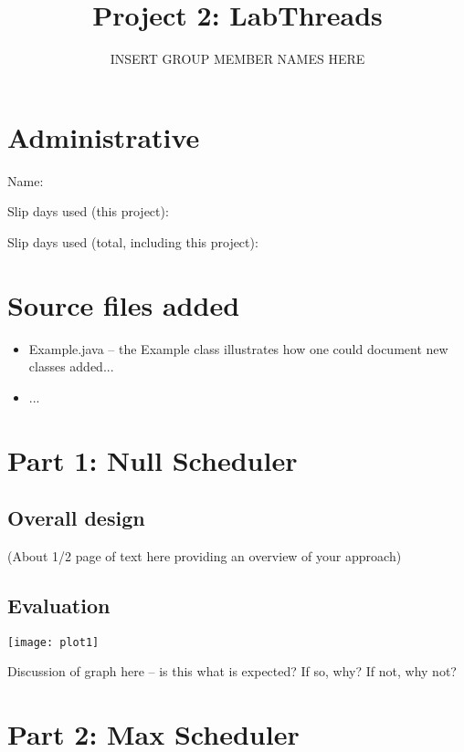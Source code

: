 \documentclass[11pt, letterpaper]{article}
\title{Project 2: LabThreads}
\author{INSERT GROUP MEMBER NAMES HERE}
\begin{document}
\maketitle

\section{Administrative}

Name:

Slip days used (this project):

Slip days used (total, including this project):


\section{Source files added}

  \begin{itemize}

  \item Example.java -- the Example class illustrates how one could
  document new classes added...

  \item ...

  \end{itemize}




\section{Part 1: Null Scheduler}

\subsection{Overall design}

(About 1/2 page of text here providing an overview of your approach)

\subsection{Evaluation}

\centerline{\texttt{[image: plot1]}}

Discussion of graph here -- is this what is expected? If so, why? If not, why not?




\section{Part 2: Max Scheduler}
\end{document}
